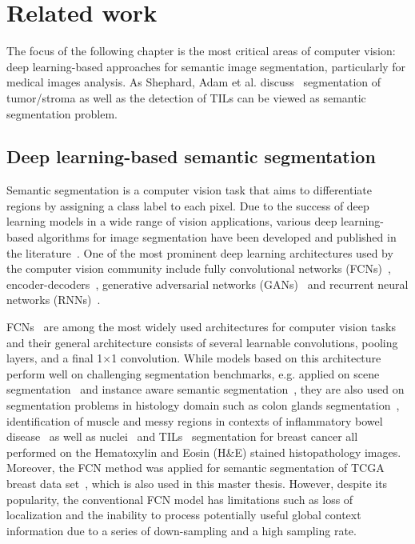 \chapter{Related work}
The focus of the following chapter is the most critical areas of computer vision: deep learning-based approaches for semantic image segmentation, particularly for medical images analysis. As Shephard, Adam et al. discuss~\cite{shephard2022tiager} segmentation of tumor/stroma as well as the detection of TILs can be viewed as semantic segmentation problem. 
\section{Deep learning-based semantic segmentation}
Semantic segmentation is a computer vision task that aims to differentiate regions by assigning a class label to each pixel. Due to the success of deep learning models in a wide range of vision applications, various deep learning-based algorithms for image segmentation have been developed and published in the literature~\cite{minaee2021image}. One of the most prominent deep learning architectures used by the computer vision community include fully convolutional networks (FCNs)~\cite{long2015fully}, encoder-decoders~\cite{noh2015learning}, generative adversarial networks (GANs)~\cite{goodfellow2014generative} and recurrent neural networks (RNNs)~\cite{rumelhart1986learning}.

FCNs~\cite{long2015fully} are among the most widely used architectures for computer vision tasks and their general architecture consists of several learnable convolutions, pooling layers, and a final 1$\times$1 convolution. While models based on this architecture perform well on challenging segmentation benchmarks, e.g. applied on scene segmentation~\cite{yu2020context} and instance aware semantic segmentation~\cite{li2017fully}, they are also used on segmentation problems in histology domain such as colon glands segmentation~\cite{bentaieb2016topology}, identification of muscle and messy regions in contexts of inflammatory bowel disease~\cite{wang2016deep} as well as nuclei~\cite{natarajan2020segmentation} and TILs~\cite{amgad2019joint} segmentation for breast cancer all performed on the Hematoxylin and Eosin (H\&E) stained histopathology images. Moreover, the FCN method was applied for semantic segmentation of TCGA~\cite{gutman2013cancer} breast data set~\cite{amgad2019structured}, which is also used in this master thesis. However, despite its popularity, the conventional FCN model has limitations such as loss of localization and the inability to process potentially useful global context information due to a series of down-sampling and a high sampling rate.

